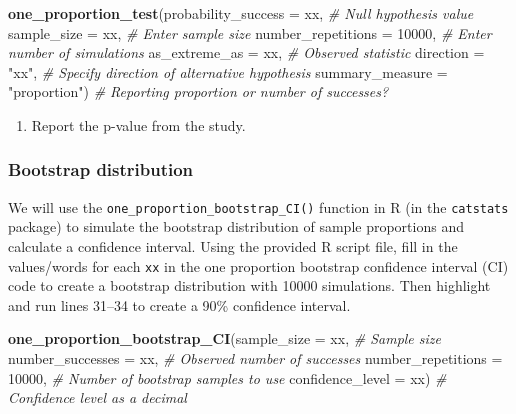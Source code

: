 \documentclass[
]{report}
\newenvironment{Shaded}{\begin{snugshade}}{\end{snugshade}}
\newcommand{\AttributeTok}[1]{\textcolor[rgb]{0.13,0.29,0.53}{#1}}
\newcommand{\CommentTok}[1]{\textcolor[rgb]{0.56,0.35,0.01}{\textit{#1}}}
\newcommand{\DecValTok}[1]{\textcolor[rgb]{0.00,0.00,0.81}{#1}}
\newcommand{\FunctionTok}[1]{\textcolor[rgb]{0.13,0.29,0.53}{\textbf{#1}}}
\newcommand{\NormalTok}[1]{#1}
\newcommand{\StringTok}[1]{\textcolor[rgb]{0.31,0.60,0.02}{#1}}
\providecommand{\tightlist}{%
  \setlength{\itemsep}{0pt}\setlength{\parskip}{0pt}}
\begin{document}
\begin{Shaded}
\begin{Highlighting}[]
\FunctionTok{one\_proportion\_test}\NormalTok{(}\AttributeTok{probability\_success =}\NormalTok{ xx, }\CommentTok{\# Null hypothesis value}
          \AttributeTok{sample\_size =}\NormalTok{ xx, }\CommentTok{\# Enter sample size}
          \AttributeTok{number\_repetitions =} \DecValTok{10000}\NormalTok{, }\CommentTok{\# Enter number of simulations}
          \AttributeTok{as\_extreme\_as =}\NormalTok{ xx, }\CommentTok{\# Observed statistic}
          \AttributeTok{direction =} \StringTok{"xx"}\NormalTok{, }\CommentTok{\# Specify direction of alternative hypothesis}
          \AttributeTok{summary\_measure =} \StringTok{"proportion"}\NormalTok{) }\CommentTok{\# Reporting proportion or number of successes?}
\end{Highlighting}
\end{Shaded}

\begin{enumerate}
\def\labelenumi{\arabic{enumi}.}
\setcounter{enumi}{5}
\tightlist
\item
  Report the p-value from the study.
\end{enumerate}

\newpage

\subsubsection*{Bootstrap distribution}\label{bootstrap-distribution}

We will use the \texttt{one\_proportion\_bootstrap\_CI()} function in R (in the \texttt{catstats} package) to simulate the bootstrap distribution of sample proportions and calculate a confidence interval. Using the provided R script file, fill in the values/words for each \texttt{xx} in the one proportion bootstrap confidence interval (CI) code to create a bootstrap distribution with 10000 simulations. Then highlight and run lines 31--34 to create a 90\% confidence interval.

\begin{Shaded}
\begin{Highlighting}[]
\FunctionTok{one\_proportion\_bootstrap\_CI}\NormalTok{(}\AttributeTok{sample\_size =}\NormalTok{ xx, }\CommentTok{\# Sample size}
                    \AttributeTok{number\_successes =}\NormalTok{ xx, }\CommentTok{\# Observed number of successes}
                    \AttributeTok{number\_repetitions =} \DecValTok{10000}\NormalTok{, }\CommentTok{\# Number of bootstrap samples to use}
                    \AttributeTok{confidence\_level =}\NormalTok{ xx) }\CommentTok{\# Confidence level as a decimal}
\end{Highlighting}
\end{Shaded}
\end{document}

